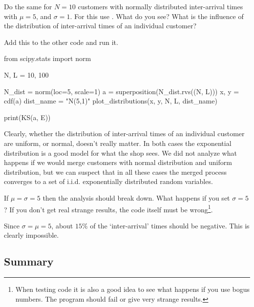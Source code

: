 \begin{exercise}
Do the same for $N=10$ customers with normally distributed inter-arrival times with $\mu=5$, and $\sigma =1$.
For this use . What do you see? What is the influence of the distribution of inter-arrival times of an individual customer? 
\begin{solution}
Add this to the other code and run it. 
\begin{pyverbatim}
from scipy.stats import norm

N, L = 10, 100

N_dist = norm(loc=5, scale=1)
a = superposition(N_dist.rvs((N, L)))
x, y = cdf(a)
dist_name = "N(5,1)"
plot_distributions(x, y, N, L, dist_name)

print(KS(a, E))
\end{pyverbatim}

Clearly, whether the distribution of inter-arrival times of an individual customer are uniform, or normal, doesn't really matter. In both cases the exponential distribution is a good model for what the shop sees. We did not analyze what happens if we would merge customers with normal distribution and uniform distribution, but we can suspect that in all these cases the merged process converges to a set of i.i.d. exponentially distributed random variables.

\end{solution}
\end{exercise}

\begin{exercise}
If  $\mu=\sigma=5$ then the analysis should break down. What happens if you set $\sigma=5$? If you don't get real strange results, the code itself must be wrong\footnote{When testing code it is also a good idea to see what happens if you use bogus numbers. The program should fail or give very strange results.}.
\begin{solution}
  Since $\sigma=\mu=5$, about $15\%$ of the `inter-arrival' times should be negative. This is clearly impossible. 
\end{solution}	
\end{exercise}

\subsection{Summary}
\label{sec:summary-1}



